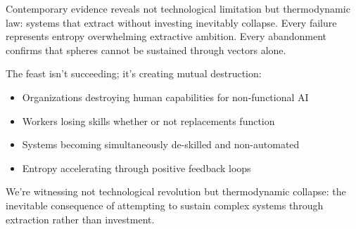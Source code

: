 Contemporary evidence reveals not technological limitation but thermodynamic law: systems that extract without investing inevitably collapse. Every failure represents entropy overwhelming extractive ambition. Every abandonment confirms that spheres cannot be sustained through vectors alone.

The feast isn't succeeding; it's creating mutual destruction:
\begin{itemize}
\item Organizations destroying human capabilities for non-functional AI
\item Workers losing skills whether or not replacements function
\item Systems becoming simultaneously de-skilled and non-automated
\item Entropy accelerating through positive feedback loops
\end{itemize}

We're witnessing not technological revolution but thermodynamic collapse: the inevitable consequence of attempting to sustain complex systems through extraction rather than investment.
